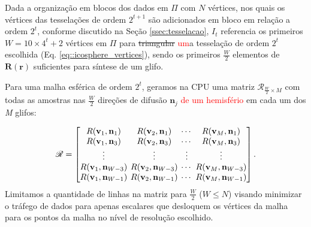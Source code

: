 Dada a organização em blocos dos dados em $\Pi$ com $N$ vértices, nos quais os vértices das tesselações de ordem $2^{t+1}$ são adicionados em bloco em relação a ordem $2^t$, conforme discutido na Seção \ref{ssec:tesselacao}, $I_t$ referencia os primeiros $W = 10 \times 4^t + 2$ vértices em $\Pi$ para \sout{triangular} \textcolor{red}{um}a tesselação de ordem $2^t$ escolhida (Eq. \ref{eq::icosphere_vertices}), sendo os primeiros $\frac{W}{2}$ elementos de $\boldsymbol{R}(\mathbf{r})$ suficientes para síntese de um glifo.

Para uma malha esférica de ordem $2^t$, geramos na CPU uma matriz $\boldsymbol{\mathscr{R}}_{\frac{W}{2} \times M}$ com todas as amostras nas $\frac{W}{2}$ direções de difusão $\mathbf{n}_j$ \textcolor{red}{de um hemisfério} em cada um dos \textit{M} glifos: 

\begin{equation}
\label{eq::R}
\boldsymbol{\mathscr{R}} = 
\begingroup %
\setlength\arraycolsep{2pt}
\begin{bmatrix} 
    R(\mathbf{v}_{1}, \mathbf{n}_1) &
    R(\mathbf{v}_{2}, \mathbf{n}_1) & \cdots & 
    R(\mathbf{v}_{M}, \mathbf{n}_1)  \\
    
    R(\mathbf{v}_{1}, \mathbf{n}_3) &
    R(\mathbf{v}_{2}, \mathbf{n}_3) & \cdots & 
    R(\mathbf{v}_{M}, \mathbf{n}_{3}) \\ \vdots & \vdots & \vdots & \vdots  \\
    
    R(\mathbf{v}_{1}, \mathbf{n}_{W-3}) &
    R(\mathbf{v}_{2}, \mathbf{n}_{W-3}) & \cdots & 
    R(\mathbf{v}_{M}, \mathbf{n}_{W-3})  \\
    
    R(\mathbf{v}_{1}, \mathbf{n}_{W-1}) & 
    R(\mathbf{v}_{2}, \mathbf{n}_{W-1}) & \cdots & 
    R(\mathbf{v}_{M}, \mathbf{n}_{W-1})
\end{bmatrix}.
\endgroup
\end{equation}
Limitamos a quantidade de linhas na matriz para $\frac{W}{2}$ ($W \leq N$) visando minimizar o tráfego de dados para apenas escalares que desloquem os vértices da malha para os pontos da malha no nível de resolução escolhido.

